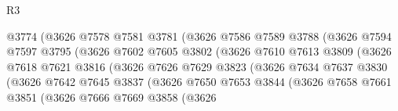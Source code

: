 \begin{lexlean}{R3}
\begin{coremodule}
                                  @3774
                                  (@3626
                                    @7578
                                    @7581
                                    @3781
                                    (@3626
                                      @7586
                                      @7589
                                      @3788
                                      (@3626
                                        @7594
                                        @7597
                                        @3795
                                        (@3626
                                          @7602
                                          @7605
                                          @3802
                                          (@3626
                                            @7610
                                            @7613
                                            @3809
                                            (@3626
                                              @7618
                                              @7621
                                              @3816
                                              (@3626
                                                @7626
                                                @7629
                                                @3823
                                                (@3626
                                                  @7634
                                                  @7637
                                                  @3830
                                                  (@3626
                                                    @7642
                                                    @7645
                                                    @3837
                                                    (@3626
                                                      @7650
                                                      @7653
                                                      @3844
                                                      (@3626
                                                        @7658
                                                        @7661
                                                        @3851
                                                        (@3626
                                                          @7666
                                                          @7669
                                                          @3858
                                                          (@3626

\end{coremodule}
\end{lexlean}
